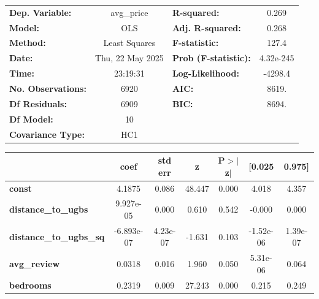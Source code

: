 \begin{center}
\begin{tabular}{lclc}
\toprule
\textbf{Dep. Variable:}         &    avg\_price    & \textbf{  R-squared:         } &     0.269   \\
\textbf{Model:}                 &       OLS        & \textbf{  Adj. R-squared:    } &     0.268   \\
\textbf{Method:}                &  Least Squares   & \textbf{  F-statistic:       } &     127.4   \\
\textbf{Date:}                  & Thu, 22 May 2025 & \textbf{  Prob (F-statistic):} & 4.32e-245   \\
\textbf{Time:}                  &     23:19:31     & \textbf{  Log-Likelihood:    } &   -4298.4   \\
\textbf{No. Observations:}      &        6920      & \textbf{  AIC:               } &     8619.   \\
\textbf{Df Residuals:}          &        6909      & \textbf{  BIC:               } &     8694.   \\
\textbf{Df Model:}              &          10      & \textbf{                     } &             \\
\textbf{Covariance Type:}       &       HC1        & \textbf{                     } &             \\
\bottomrule
\end{tabular}
\begin{tabular}{lcccccc}
                                & \textbf{coef} & \textbf{std err} & \textbf{z} & \textbf{P$> |$z$|$} & \textbf{[0.025} & \textbf{0.975]}  \\
\midrule
\textbf{const}                  &       4.1875  &        0.086     &    48.447  &         0.000        &        4.018    &        4.357     \\
\textbf{distance\_to\_ugbs}     &    9.927e-05  &        0.000     &     0.610  &         0.542        &       -0.000    &        0.000     \\
\textbf{distance\_to\_ugbs\_sq} &   -6.893e-07  &     4.23e-07     &    -1.631  &         0.103        &    -1.52e-06    &     1.39e-07     \\
\textbf{avg\_review}            &       0.0318  &        0.016     &     1.960  &         0.050        &     5.31e-06    &        0.064     \\
\textbf{bedrooms}               &       0.2319  &        0.009     &    27.243  &         0.000        &        0.215    &        0.249     \\

\end{tabular}
\end{center}
